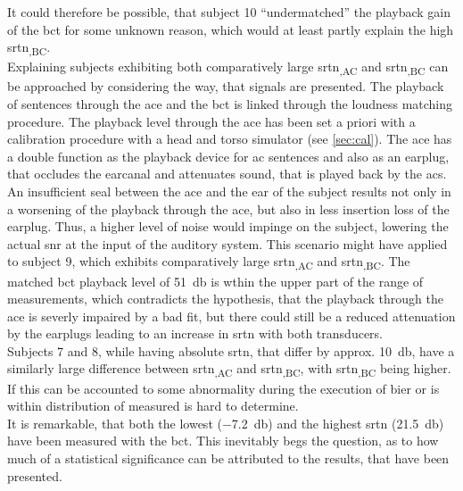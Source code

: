 It could therefore be possible, that subject 10 \enquote{undermatched} the playback gain of the \gls{bct} for some unknown reason, which would at least partly explain the high \gls{srtn}\textsubscript{,BC}.\\
Explaining subjects exhibiting both comparatively large \gls{srtn}\textsubscript{,AC} and \gls{srtn}\textsubscript{,BC} can be approached by considering the way, that signals are presented.
The playback of sentences through the \gls{ace} and the \gls{bct} is linked through the loudness matching procedure. The playback level through the \gls{ace} has been set a priori with a calibration procedure with a head and torso simulator (see \autoref{sec:cal}). The \gls{ace} has a double function as the playback device for \gls{ac} sentences and also as an earplug, that occludes the earcanal and attenuates sound, that is played back by the \gls{acs}.
An insufficient seal between the \gls{ace} and the ear of the subject results not only in a worsening of the playback through the \gls{ace}, but also in less insertion loss of the earplug. Thus, a higher level of noise would impinge on the subject, lowering the actual \gls{snr} at the input of the auditory system.
This scenario might have applied to subject 9, which exhibits comparatively large \gls{srtn}\textsubscript{,AC} and \gls{srtn}\textsubscript{,BC}. 
The matched \gls{bct} playback level of \SI{51}{\decibel} is wthin the upper part of the range of measurements, which contradicts the hypothesis, that the playback through the \gls{ace} is severly impaired by a bad fit, but there could still be a reduced attenuation by the earplugs leading to an increase in \gls{srtn} with both transducers.\\
Subjects 7 and 8, while having absolute \gls{srtn}, that differ by approx. \SI{10}{\decibel}, have a similarly large difference between \gls{srtn}\textsubscript{,AC} and \gls{srtn}\textsubscript{,BC}, with \gls{srtn}\textsubscript{,BC} being higher.
If this can be accounted to some abnormality during the execution of \gls{bier} or is within distribution of measured is hard to determine.\\
It is remarkable, that both the lowest (\SI{-7.2}{\decibel}) and the highest \gls{srtn} (\SI{21.5}{\decibel}) have been measured with the \gls{bct}.
This inevitably begs the question, as to how much of a statistical significance can be attributed to the results, that have been presented.\\

